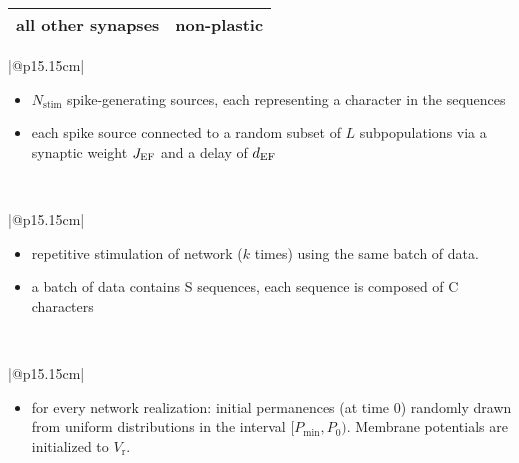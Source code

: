 \documentclass[10pt,a4paper,twoside,american]{article}
\newcommand{\EF}{{\exc\textnormal{F}}}
\newcommand{\exc}{\textnormal{E}}     %
\begin{document}
\begin{table}[ht!]
\begin{tabular}{|@{\hspace*{1mm}}p{3cm}@{}|@{\hspace*{1mm}}p{}|}
  \\
  \hline 
    \textbf{all other synapses} & 
                   non-plastic
  \\
  \hline
\end{tabular}
\begin{tabular}{|@{\hspace*{1mm}}p{15.15cm}|}
  \\
  \begin{itemize}
  \item $N_\text{stim}$ spike-generating sources, each representing a character in the sequences
  \item each spike source connected to a random subset of $L$ subpopulations via a synaptic weight $J_\EF$ and a delay of $d_\EF$
  \end{itemize}
  \\
\hline 
\end{tabular}
\begin{tabular}{|@{\hspace*{1mm}}p{15.15cm}|}
  \\
  \begin{itemize}
  \item repetitive stimulation of network ($k$ times) using the same batch of data.
  \item a batch of data contains S sequences, each sequence is composed of C characters
  \end{itemize}
  \\
  \hline
\end{tabular}
\begin{tabular}{|@{\hspace*{1mm}}p{15.15cm}|}
   \\
  \begin{itemize}
    \item for every network realization: initial permanences (at time $0$) randomly drawn from uniform distributions in the interval $[P_\text{min},P_0)$. Membrane potentials are initialized to $V_\text{r}$.
  \end{itemize}\\
  \hline
\end{tabular}
\begin{tabular}{|@{\hspace*{1mm}}p{15.15cm}|}

\end{tabular}
\end{table}
\end{document}

